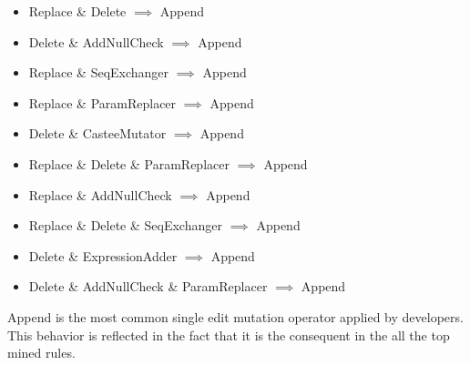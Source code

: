 \documentclass[conference]{IEEEtran}
\begin{document}
\begin{itemize}
\item Replace \& Delete $\implies$ Append
\item Delete \& AddNullCheck $\implies$ Append
\item Replace \& SeqExchanger $\implies$ Append
\item Replace \& ParamReplacer $\implies$ Append
\item Delete \& CasteeMutator $\implies$ Append
\item Replace \& Delete \& ParamReplacer $\implies$ Append
\item Replace \& AddNullCheck $\implies$ Append
\item Replace \& Delete \& SeqExchanger $\implies$ Append
\item Delete \& ExpressionAdder $\implies$ Append
\item Delete \& AddNullCheck \& ParamReplacer $\implies$ Append
\end{itemize}

Append is the most common single edit mutation operator applied by developers. This behavior is
reflected in the fact that it is the consequent in the all the top mined
rules.  
\end{document}
